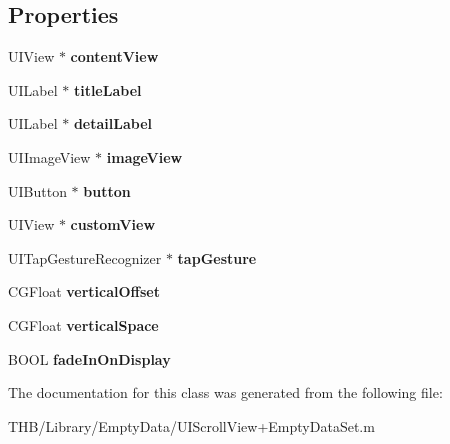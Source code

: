\subsection*{Properties}
\begin{DoxyCompactItemize}
\item 
\mbox{\label{interface_d_z_n_empty_data_set_view_adae47e65081cda2e724ab5e24e56bd97}} 
U\+I\+View $\ast$ {\bfseries content\+View}
\item 
\mbox{\label{interface_d_z_n_empty_data_set_view_ad90e62147c0aebf2b853fc4a67baf8c1}} 
U\+I\+Label $\ast$ {\bfseries title\+Label}
\item 
\mbox{\label{interface_d_z_n_empty_data_set_view_af6c85de44a12f23af11927dc01d8cdee}} 
U\+I\+Label $\ast$ {\bfseries detail\+Label}
\item 
\mbox{\label{interface_d_z_n_empty_data_set_view_accc3205d2da145247bd73c24b8ebb887}} 
U\+I\+Image\+View $\ast$ {\bfseries image\+View}
\item 
\mbox{\label{interface_d_z_n_empty_data_set_view_a16d4b9726371d0380c656cd1d443639b}} 
U\+I\+Button $\ast$ {\bfseries button}
\item 
\mbox{\label{interface_d_z_n_empty_data_set_view_ac97b8c605ae56c3e69cf8471d3b1c8aa}} 
U\+I\+View $\ast$ {\bfseries custom\+View}
\item 
\mbox{\label{interface_d_z_n_empty_data_set_view_ac735ec97dee8f6bfa6db5f7340884034}} 
U\+I\+Tap\+Gesture\+Recognizer $\ast$ {\bfseries tap\+Gesture}
\item 
\mbox{\label{interface_d_z_n_empty_data_set_view_a31b080efa2da564eac705a087d285656}} 
C\+G\+Float {\bfseries vertical\+Offset}
\item 
\mbox{\label{interface_d_z_n_empty_data_set_view_a802a2d49f3d6296dfbc02b39a3f65a55}} 
C\+G\+Float {\bfseries vertical\+Space}
\item 
\mbox{\label{interface_d_z_n_empty_data_set_view_a89a70b4870eb88820321b6d03f3b9788}} 
B\+O\+OL {\bfseries fade\+In\+On\+Display}
\end{DoxyCompactItemize}


The documentation for this class was generated from the following file\+:\begin{DoxyCompactItemize}
\item 
T\+H\+B/\+Library/\+Empty\+Data/U\+I\+Scroll\+View+\+Empty\+Data\+Set.\+m\end{DoxyCompactItemize}
